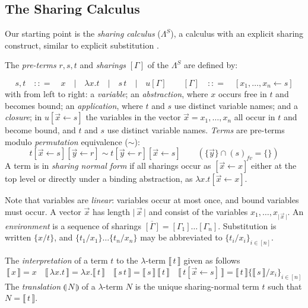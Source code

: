 \documentclass[a4paper,UKenglish,cleveref, autoref]{lipics-v2019}
\newcommand{\SLC}{\Lambda^{S}}
\newcommand{\fv}[1]{(#1)_{fv}}
\newcommand{\set}[1]{ \{ #1 \} }
\newcommand{\abs}[2]{\lambda #1 . #2}
\newcommand{\app}[2]{#1 \, #2}
\newcommand{\share}[3]{#1 [#2 \leftarrow #3]}
\newcommand{\size}[1]{\vert \, #1 \, \vert}
\newcommand{\sub}[3]{#1 \{ #2 / #3 \}}
\newcommand{\compile}[1]{\llparenthesis \, #1 \, \rrparenthesis}
\newcommand{\readbackclose}[1]{\llbracket \, #1 \, \rrbracket }
\begin{document}
\subsection{The Sharing Calculus}

Our starting point is the \emph{sharing calculus} ($\SLC$), a calculus with an explicit sharing construct, similar to explicit substitution \cite{levy1991}.

\begin{definition}
\label{def:sharingcalsyntax}
The \emph{pre-terms} $r, s, t$ and \emph{sharings} $[\Gamma]$ of the $\SLC$ are defined by:

$$s, t \quad {:}{:}{=} \quad x \quad \vert \quad \abs{x}{t} \quad \vert \quad \app{s}{t} \quad \vert \quad u[\Gamma] \quad \quad [\Gamma] \quad {:}{:}{=} \quad \share{}{x_{1}, \dots, x_{n}}{s}$$
with from left to right: a \emph{variable}; an \emph{abstraction}, where $x$ occurs free in $t$ and becomes bound; an \emph{application}, where $t$ and $s$ use distinct variable names; and a \emph{closure}; in $\share{u}{\vec{x}}{s}$ the variables in the vector $\vec{x} = x_{1}, \dots, x_{n}$ all occur in $t$ and become bound, and $t$ and $s$ use distinct variable names. \emph{Terms} are pre-terms modulo \emph{permutation} equivalence ($\sim$):
$$\share{t}{\vec{x}}{s} \share{}{\vec{y}}{r} \sim t \share{}{\vec{y}}{r} \share{}{\vec{x}}{s} \quad \quad (\set{\vec{y}} \cap \fv{s} = \set{} )$$
A term is in \emph{sharing normal form} if all sharings occur as $\share{}{\vec{x}}{x}$ either at the top level or directly under a binding abstraction, as $\abs{x}{\share{t}{\vec{x}}{x}}$.
\end{definition}

\noindent Note that variables are \emph{linear}: variables occur at most once, and bound variables must occur. A vector $\vec{x}$ has length $\size{\vec{x}}$ and consist of the variables $x_{1}, \dots, x_{\size{\vec{x}}}$. An \emph{environment} is a sequence of sharings $\overline{[\Gamma]} = [\Gamma_{1}] \dots [\Gamma_{n}]$. Substitution is written $\sub{}{x}{t}$, and $\sub{}{t_{1}}{x_{1}} \dots \sub{}{t_{n}}{x_{n}}$ may be abbreviated to $\sub{}{t_{i}}{x_{i}}_{i \in [n]}$.

\begin{definition}
The \emph{interpretation} of a term $t$ to the $\lambda$-term $\readbackclose{t}$ given as follows
$$\readbackclose{x} = x \quad \readbackclose{\abs{x}{t}} = \abs{x}{\readbackclose{t}} \quad \readbackclose{\app{s}{t}} = \app{\readbackclose{s}}{\readbackclose{t}} \quad \readbackclose{\share{t}{\vec{x}}{s}} = \readbackclose{t} \sub{}{\readbackclose{s}}{x_{i}}_{i \in [n]}$$
The \emph{translation} $\compile{N}$ of a $\lambda$-term $N$ is the unique sharing-normal term $t$ such that $N = \readbackclose{t}$.
\end{definition}
\end{document}
